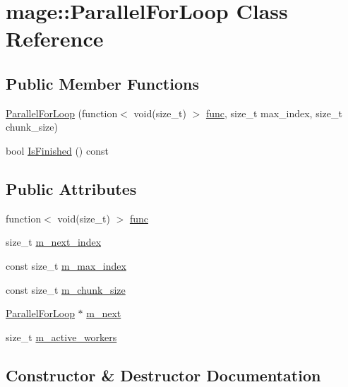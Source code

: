 \hypertarget{classmage_1_1_parallel_for_loop}{}\section{mage\+:\+:Parallel\+For\+Loop Class Reference}
\label{classmage_1_1_parallel_for_loop}
\subsection*{Public Member Functions}
\begin{DoxyCompactItemize}
\item 
\hyperlink{classmage_1_1_parallel_for_loop_aece78e3074ed1c04f49c62da400a1aa9}{Parallel\+For\+Loop} (function$<$ void(size\+\_\+t) $>$ \hyperlink{classmage_1_1_parallel_for_loop_a3651892e12fc6cdf87b7c74ffe68e82c}{func}, size\+\_\+t max\+\_\+index, size\+\_\+t chunk\+\_\+size)
\item 
bool \hyperlink{classmage_1_1_parallel_for_loop_a6ca9c77ef5475a0df0f742f2301d2d40}{Is\+Finished} () const
\end{DoxyCompactItemize}
\subsection*{Public Attributes}
\begin{DoxyCompactItemize}
\item 
function$<$ void(size\+\_\+t) $>$ \hyperlink{classmage_1_1_parallel_for_loop_a3651892e12fc6cdf87b7c74ffe68e82c}{func}
\item 
size\+\_\+t \hyperlink{classmage_1_1_parallel_for_loop_a3d0ef5cd968afc70d03cd1b740fcf4cb}{m\+\_\+next\+\_\+index}
\item 
const size\+\_\+t \hyperlink{classmage_1_1_parallel_for_loop_a1ef5e1094e5c20658a62faed566cb163}{m\+\_\+max\+\_\+index}
\item 
const size\+\_\+t \hyperlink{classmage_1_1_parallel_for_loop_a5c17c6e07dda15386c475dc2f80bd8ba}{m\+\_\+chunk\+\_\+size}
\item 
\hyperlink{classmage_1_1_parallel_for_loop}{Parallel\+For\+Loop} $\ast$ \hyperlink{classmage_1_1_parallel_for_loop_a8a0b3a82891160006795656c06c772da}{m\+\_\+next}
\item 
size\+\_\+t \hyperlink{classmage_1_1_parallel_for_loop_ae991b27616bf56e3660124e4d0b7d0ef}{m\+\_\+active\+\_\+workers}
\end{DoxyCompactItemize}


\subsection{Constructor \& Destructor Documentation}
\hypertarget{classmage_1_1_parallel_for_loop_aece78e3074ed1c04f49c62da400a1aa9}{}\label{classmage_1_1_parallel_for_loop_aece78e3074ed1c04f49c62da400a1aa9} 

